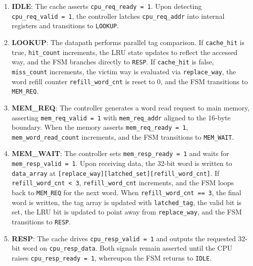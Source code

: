 \documentclass[conference]{IEEEtran}
\begin{document}
\begin{enumerate}
    \item \textbf{IDLE}: The cache asserts \texttt{cpu\_req\_ready = 1}. Upon detecting \texttt{cpu\_req\_valid = 1}, the controller latches \texttt{cpu\_req\_addr} into internal registers and transitions to \texttt{LOOKUP}.
    \item \textbf{LOOKUP}: The datapath performs parallel tag comparison. If \texttt{cache\_hit} is true, \texttt{hit\_count} increments, the LRU state updates to reflect the accessed way, and the FSM branches directly to \texttt{RESP}. If \texttt{cache\_hit} is false, \texttt{miss\_count} increments, the victim way is evaluated via \texttt{replace\_way}, the word refill counter \texttt{refill\_word\_cnt} is reset to 0, and the FSM transitions to \texttt{MEM\_REQ}.
    \item \textbf{MEM\_REQ}: The controller generates a word read request to main memory, asserting \texttt{mem\_req\_valid = 1} with \texttt{mem\_req\_addr} aligned to the 16-byte boundary. When the memory asserts \texttt{mem\_req\_ready = 1}, \texttt{mem\_word\_read\_count} increments, and the FSM transitions to \texttt{MEM\_WAIT}.
    \item \textbf{MEM\_WAIT}: The controller sets \texttt{mem\_resp\_ready = 1} and waits for \texttt{mem\_resp\_valid = 1}. Upon receiving data, the 32-bit word is written to \texttt{data\_array} at \texttt{[replace\_way][latched\_set][refill\_word\_cnt]}. If \texttt{refill\_word\_cnt < 3}, \texttt{refill\_word\_cnt} increments, and the FSM loops back to \texttt{MEM\_REQ} for the next word. When \texttt{refill\_word\_cnt == 3}, the final word is written, the tag array is updated with \texttt{latched\_tag}, the valid bit is set, the LRU bit is updated to point away from \texttt{replace\_way}, and the FSM transitions to \texttt{RESP}.
    \item \textbf{RESP}: The cache drives \texttt{cpu\_resp\_valid = 1} and outputs the requested 32-bit word on \texttt{cpu\_resp\_data}. Both signals remain asserted until the CPU raises \texttt{cpu\_resp\_ready = 1}, whereupon the FSM returns to \texttt{IDLE}.
\end{enumerate}
\end{document}
